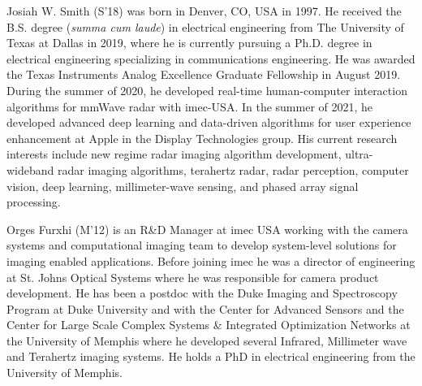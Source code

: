 \documentclass[10pt,journal,final]{IEEEtran}
\begin{document}
\begin{IEEEbiography}{Josiah W. Smith} (S'18) was born in Denver, CO, USA in 1997. He received the B.S. degree (\textit{summa cum laude}) in electrical engineering from The University of Texas at Dallas in 2019, where he is currently pursuing a Ph.D. degree in electrical engineering specializing in communications engineering. He was awarded the Texas Instruments Analog Excellence Graduate Fellowship in August 2019. During the summer of 2020, he developed real-time human-computer interaction algorithms for mmWave radar with imec-USA. In the summer of 2021, he developed advanced deep learning and data-driven algorithms for user experience enhancement at Apple in the Display Technologies group. His current research interests include new regime radar imaging algorithm development, ultra-wideband radar imaging algorithms, terahertz radar, radar perception, computer vision, deep learning, millimeter-wave sensing, and phased array signal processing.
\end{IEEEbiography}

\begin{IEEEbiography}{Orges Furxhi} (M'12) is an R\&D Manager at imec USA working with the camera systems and computational imaging team to develop system-level solutions for imaging enabled applications. 
Before joining imec he was a director of engineering at St. Johns Optical Systems where he was responsible for camera product development. 
He has been a postdoc with the Duke Imaging and Spectroscopy Program at Duke University and with the Center for Advanced Sensors and the Center for Large Scale Complex Systems \& Integrated Optimization Networks at the University of Memphis where he developed several Infrared, Millimeter wave and Terahertz imaging systems. 
He holds a PhD in electrical engineering from the University of Memphis.
\end{IEEEbiography}
\end{document}
